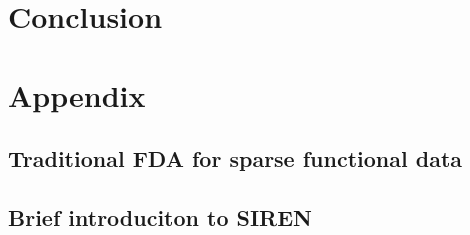 \documentclass{article}
\begin{document}
\section{Conclusion}

\section{Appendix}

\subsection{Traditional FDA for sparse functional data}

\subsection{Brief introduciton to SIREN}




\end{document}
